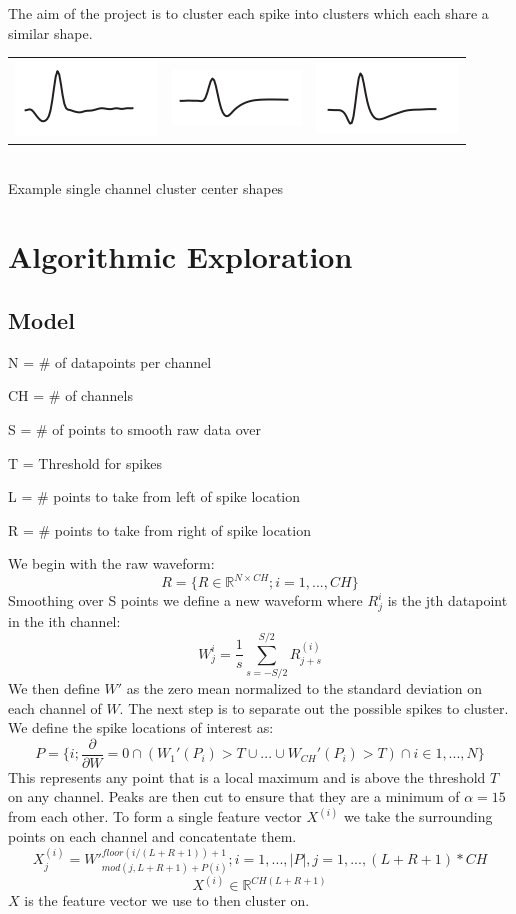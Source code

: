 \documentclass[conference]{IEEEtran}
\begin{document}
The aim of the project is to cluster each spike into clusters
which each share a similar shape. 

\begin{center}
  \begin{tabular}{c c c}
    \includegraphics[width=0.17\linewidth]{WaveShape1.png} &
    \includegraphics[width=0.17\linewidth]{WaveShape2.png} &
    \includegraphics[width=0.17\linewidth]{WaveShape3.png}
  \end{tabular}
  \\
  \small{Example single channel cluster center shapes}
\end{center}

\section{Algorithmic Exploration}
\subsection{Model}

N = \# of datapoints per channel

CH = \# of channels

S = \# of points to smooth raw data over

T = Threshold for spikes

L = \# points to take from left of spike location

R = \# points to take from right of spike location

We begin with the raw waveform:
$$R = \{ {R \in \mathbb{R}^{N \times CH}; i = 1,...,CH} \}$$
Smoothing over S points we define a new waveform where $R^i_j$
is the jth datapoint in the ith channel: 
$$W^i_j = \frac{1}{s}\sum_{s=-S/2}^{S/2}R^{(i)}_{j+s}$$
We then define $W'$ as the zero mean normalized to the standard
deviation on each channel of $W$. The next step is to
separate out the possible spikes to cluster. We define the
spike locations of interest as:
$$P = \{ i; \frac{\partial}{\partial W} = 0 \cap 
  (W_1'(P_i) > T \cup ... \cup W_{CH}'(P_i) > T) \cap i \in
  1,...,N \} $$
This represents any point that is a local maximum and is above the
threshold $T$ on any channel. Peaks are then cut to ensure that they are a minimum of
$\alpha = 15$ from each other. To form a single feature vector $X^{(i)}$ we take the
 surrounding points on each channel and concatentate them.
 $$X^{(i)}_j = W'^{floor(i/(L+R+1))+1}_{mod(j, L+R+1) + P(i)}
  ; i = 1,...,|P|, j = 1,...,(L+R+1)*CH$$
  $$X^{(i)} \in \mathbb{R}^{CH(L+R+1)}$$
$X$ is the feature vector we use to then cluster on.
\end{document}
